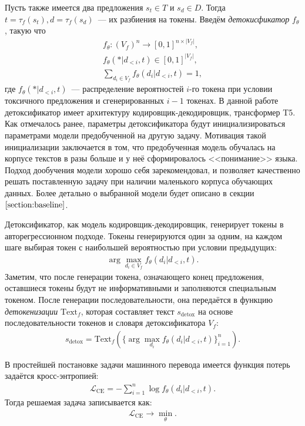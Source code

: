 Пусть также имеется два предложения $s_t \in T$ и $s_d \in D$.
Тогда $t = \tau_{f}(s_t), d = \tau_{f}(s_d)$~--- их разбиения на токены.
Введём \textit{детокисфикатор} $f_{\theta}$, такую что 
\begin{gather*}
    f_{\theta}: \left(V_f\right)^{n} \to [0, 1]^{n \times |V_f|}, \\
    f_{\theta}(* | d_{<i}, t) \in [0, 1]^{|V_f|}, \\
    \sum_{d_i \in V_f} f_\theta(d_i | d_{<i}, t) = 1,
\end{gather*}
где $f_{\theta}(* | d_{<i}, t)$~--- распределение вероятностей $i$-го токена при условии токсичного предложения и сгенерированных $i-1$ токенах.
В данной работе детоксификатор имеет архитектуру кодировщик-декодировщик, трансформер T5\cite{t5}. 
Как отмечалось ранее, параметры детоксификатора будут инициализироваться параметрами модели предобученной на другую задачу. 
Мотивация такой инициализации заключается в том, что предобученная модель обучалась на корпусе текстов в разы больше и у неё сформировалось <<понимание>> языка.
Подход дообучения модели хорошо себя зарекомендовал, и позволяет качественно решать поставленную задачу при наличии маленького корпуса обучающих данных\cite{sun2019fine}.  
Более детально о выбранной модели будет описано в секции $\ref{section:baseline}$.

Детоксификатор, как модель кодировщик-декодировщик, генерирует токены в авторегрессионном подходе.
Токены генерируются один за одним, на каждом шаге выбирая токен с наибольшей вероятностью при условии предыдущих: 
\begin{gather*}
    \arg\max_{d_{i} \in V_f} f_{\theta}(d_i | d_{<i}, t).
\end{gather*}
Заметим, что после генерации токена, означающего конец предложения, оставшиеся токены будут не информативными и заполняются специальным токеном. 
После генерации последовательности, она передаётся в функцию \textit{детокенизации} $\text{Text}_f$, которая составляет текст $s_{\text{detox}}$ на основе последовательности токенов и словаря детоксификатора $V_{f}$:
\begin{gather*}
    s_{\text{detox}} = \text{Text}_{f}\left( \{\arg\max_{d_i} f_{\theta}(d_{i} | d_{<i}, t)\}_{i=1}^{n} \right).
\end{gather*}

В простейшей постановке задачи машинного перевода имеется функция потерь задаётся кросс-энтропией:
\begin{gather*}
    \mathcal{L}_{\text{CE}} = -\sum_{i=1}^{n} \log f_\theta(d_{i} | d_{<i}, t).
\end{gather*}
Тогда решаемая задача записывается как:
\begin{gather*}
    \mathcal{L}_{\text{CE}} \longrightarrow \min_{\theta}.
\end{gather*}


